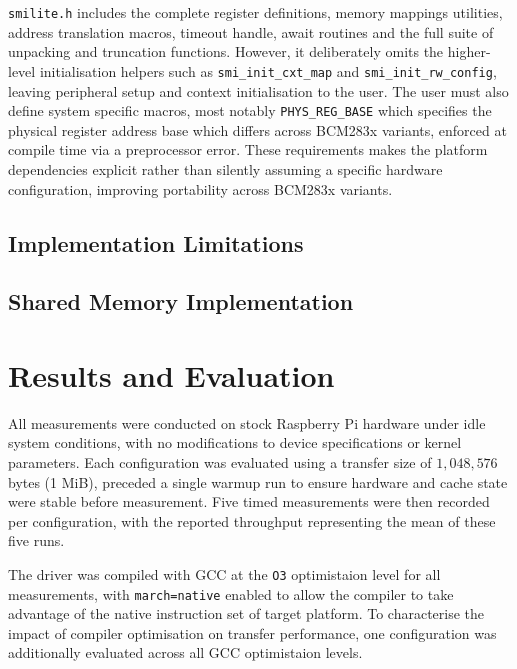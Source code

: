\documentclass[final]{cmpreport}
\begin{document}
\texttt{smilite.h} includes the complete register definitions, memory mappings utilities, address translation macros, timeout handle, await routines and the full suite of unpacking and truncation functions. However, it deliberately omits the higher-level initialisation helpers such as \texttt{smi\_init\_cxt\_map} and \texttt{smi\_init\_rw\_config}, leaving peripheral setup and context initialisation to the user. The user must also define system specific macros, most notably \texttt{PHYS\_REG\_BASE} which specifies the physical register address base which differs across BCM283x variants, enforced at compile time via a preprocessor error. These requirements makes the platform dependencies explicit rather than silently assuming a specific hardware configuration, improving portability across BCM283x variants.

\subsection{Implementation Limitations}


\subsection{Shared Memory Implementation}

\section{Results and Evaluation}\label{sec_results_and_eval}
All measurements were conducted on stock Raspberry Pi hardware under idle system conditions, with no modifications to device specifications or kernel parameters. Each configuration was evaluated using a transfer size of $1,048,576$ bytes (1 MiB), preceded a single warmup run to ensure hardware and cache state were stable before measurement. Five timed measurements were then recorded per configuration, with the reported throughput representing the mean of these five runs.

The driver was compiled with GCC at the \texttt{O3} optimistaion level for all measurements, with \texttt{march=native} enabled to allow the compiler to take advantage of the native instruction set of target platform. To characterise the impact of compiler optimisation on transfer performance, one configuration was additionally evaluated across all GCC optimistaion levels.
\end{document}
